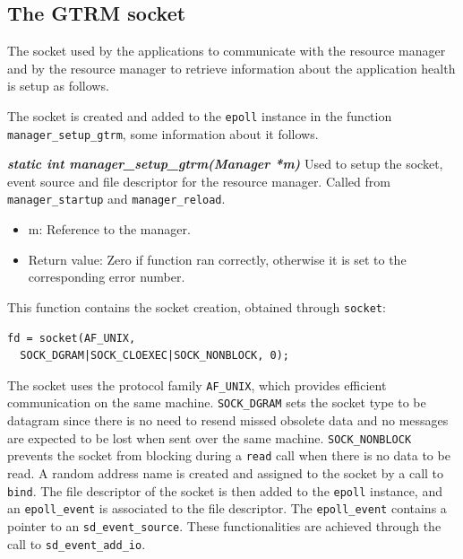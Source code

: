 \documentclass[nobiblatex]{LTHthesis}
\begin{document}
\subsection{The GTRM socket}

The socket used by the applications to communicate with the resource
manager and by the resource manager to retrieve information about the
application health is setup as follows.

The socket is created and added to the \texttt{epoll} instance in the
function \texttt{manager\_setup\_gtrm}, some information about it
follows.

\begin{framed}
	\begin{flushleft}
		\textbf{\emph{{static int manager\_setup\_gtrm(Manager *m)}}} 
    \newline
		Used to setup the socket, event source and file descriptor for the
    resource manager. Called from \texttt{manager\_startup} and 
    \texttt{manager\_reload}.
		\begin{itemize}
		\item m: Reference to the manager.
		\item Return value: Zero if function ran correctly, otherwise it is 
      set to the corresponding error number.
		\end{itemize}
	\end{flushleft}	
\end{framed}

This function contains the socket creation, obtained through
\texttt{socket}:
\begin{verbatim}
fd = socket(AF_UNIX, 
  SOCK_DGRAM|SOCK_CLOEXEC|SOCK_NONBLOCK, 0);
\end{verbatim}
The socket uses the protocol family \texttt{AF\_UNIX}, which provides
efficient communication on the same machine. \texttt{SOCK\_DGRAM} sets 
the socket type to be datagram since there is no need to resend missed
obsolete data and no messages are expected to be lost when sent over the 
same machine. \texttt{SOCK\_NONBLOCK} prevents the socket from blocking 
during a \texttt{read} call when there is no data to be read. A random 
address name is created and assigned to the socket by a call to 
\texttt{bind}. The file descriptor of the socket is then added to the 
\texttt{epoll} instance, and an \texttt{epoll\_event} is associated to
the file descriptor. The \texttt{epoll\_event} contains a pointer to 
an \texttt{sd\_event\_source}. These functionalities are achieved through
the call to \texttt{sd\_event\_add\_io}.
\end{document}
